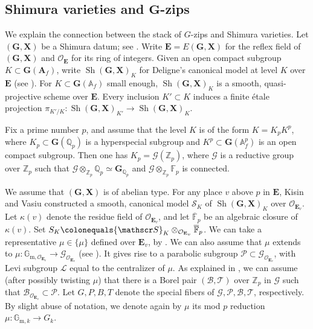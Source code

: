 \documentclass[10pt,a4paper]{article}
\numberwithin{equation}{section}
\theoremstyle{definition}
\theoremstyle{remark}
\newcommand{\Ocal}{{\mathcal O}}
\renewcommand{\AA}{\mathbb{A}}
\newcommand{\FF}{\mathbb{F}}
\newcommand{\GG}{\mathbb{G}}
\newcommand{\QQ}{\mathbb{Q}}
\newcommand{\ZZ}{\mathbb{Z}}
\newcommand{\Bscr}{{\mathscr B}}
\newcommand{\Gscr}{{\mathscr G}}
\newcommand{\Lscr}{{\mathscr L}}
\newcommand{\Pscr}{{\mathscr P}}
\newcommand{\Sscr}{{\mathscr S}}
\newcommand{\Tscr}{{\mathscr T}}
\DeclareMathOperator{\Sh}{Sh}
\newcommand{\shgx}{\Sh(\mathbf G, \mathbf X)}
\newcommand{\egx}{E(\mathbf G, \mathbf X)}
\newcommand{\gx}{(\mathbf G, \mathbf X)}
\newcommand{\gofaf}{\mathbf G(\mathbf A_f)}
\begin{document}
\subsection{Shimura varieties and $\boldsymbol{G}$-zips} \label{subsec-Shimura}
We explain the connection between the stack of $G$-zips and Shimura varieties. Let $\gx$ be a Shimura datum; see \cite[Section~2.1.1]{Deligne-Shimura-varieties}. 
Write $\mathbf{E}=\egx$ for the reflex field of $\gx$ and $\Ocal_\mathbf{E}$ for its ring of integers. 
Given an open compact subgroup $K \subset \gofaf$, write $\shgx_{K}$ for Deligne's canonical model at level $K$ over $\mathbf{E}$ (see \cite{Deligne-Shimura-varieties}). For $K\subset \mathbf{G}(\AA_f)$ small enough, $\shgx_K$ is a smooth, quasi-projective scheme over $\mathbf{E}$. Every inclusion $K' \subset K$ induces a finite \'{e}tale projection $\pi_{K'/K} \colon \shgx_{K'} \to \shgx_{K}$.


Fix a prime number $p$, and assume that the level $K$ is of the form $K=K_pK^p$,  where $K_p\subset \mathbf{G}(\QQ_p)$ is a hyperspecial subgroup and $K^p\subset \mathbf{G}(\AA_f^p)$ is an open compact subgroup. Then one has $K_p=\Gscr(\ZZ_p)$, where $\Gscr$ is a reductive group over $\ZZ_p$ such that $\Gscr\otimes_{\ZZ_p}\QQ_p\simeq \mathbf{G}_{\QQ_p}$ and $\Gscr\otimes_{\ZZ_p}\mathbb{F}_p$ is connected. 

We assume that $\gx$ is of abelian type.
For any place $v$ above $p$ in $\mathbf{E}$, Kisin \cite{Kisin-Hodge-Type-Shimura} and Vasiu \cite{Vasiu-Preabelian-integral-canonical-models} constructed a smooth, canonical model $\Sscr_K$  of $\shgx_K$ over $\Ocal_{\mathbf{E}_v}$. Let $\kappa(v)$ denote the residue field of $\Ocal_{\mathbf{E}_v}$, and let $\overline{\FF}_p$ be an algebraic closure of $\kappa(v)$. Set $S_K\colonequals \Sscr_K\otimes_{\Ocal_{\mathbf{E}_v}} \overline{\FF}_p$. We can take a representative $\mu\in \{\mu\}$ defined over $\mathbf{E}_v$, by \cite[Lemma~(1.1.3)(a)]{Kottwitz-Shimura-twisted-orbital}. 
We can also assume that $\mu$ extends to $\mu \colon \GG_{\mathrm{m},\Ocal_{\mathbf{E}_v}}\to \mathscr{G}_{\Ocal_{\mathbf{E}_v}}$ (see \cite[Corollary 3.3.11]{Kim-Rapoport-Zink-uniformization}). It gives rise to a parabolic subgroup $\Pscr\subset \mathscr{G}_{\Ocal_{\mathbf{E}_v}}$, with Levi subgroup $\Lscr$ equal to the centralizer of $\mu$. As explained in \cite[Section~2.5]{Imai-Koskivirta-vector-bundles}, we can assume (after possibly twisting $\mu$) that there is a Borel pair $(\Bscr, \Tscr)$ over $\ZZ_p$ in $\Gscr$ such that $\mathscr{B}_{\Ocal_{\mathbf{E}_v}}\subset \Pscr$. Let $G,P,B,T$ denote the special fibers of $\Gscr, \Pscr, \Bscr, \Tscr$, respectively. By slight abuse of notation, we denote again by $\mu$ its mod $p$ reduction $\mu \colon \GG_{\mathrm{m},k}\to G_k$. 
\end{document}
